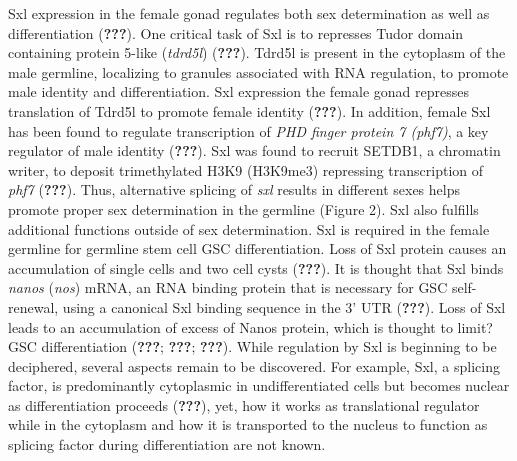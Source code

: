 \documentclass[12pt,oneside]{reedthesis}
\begin{document}
Sxl expression in the female gonad regulates both sex determination as
well as differentiation ({\textbf{???}}). One critical task of Sxl is to
represses Tudor domain containing protein 5-like (\emph{tdrd5l})
({\textbf{???}}). Tdrd5l is present in the cytoplasm of the male
germline, localizing to granules associated with RNA regulation, to
promote male identity and differentiation. Sxl expression the female
gonad represses translation of Tdrd5l to promote female identity
({\textbf{???}}). In addition, female Sxl has been found to regulate
transcription of \emph{PHD finger protein 7 (phf7)}, a key regulator of male
identity ({\textbf{???}}). Sxl was found to recruit SETDB1, a chromatin
writer, to deposit trimethylated H3K9 (H3K9me3) repressing transcription
of \emph{phf7} ({\textbf{???}}). Thus, alternative splicing of \emph{sxl} results
in different sexes helps promote proper sex determination in the
germline (Figure 2). Sxl also fulfills additional functions outside of
sex determination. Sxl is required in the female germline for germline
stem cell GSC differentiation. Loss of Sxl protein causes an
accumulation of single cells and two cell cysts ({\textbf{???}}). It is
thought that Sxl binds \emph{nanos} (\emph{nos}) mRNA, an RNA binding protein that
is necessary for GSC self-renewal, using a canonical Sxl binding
sequence in the 3' UTR ({\textbf{???}}). Loss of Sxl leads to an
accumulation of excess of Nanos protein, which is thought to limit? GSC
differentiation ({\textbf{???}}; {\textbf{???}}; {\textbf{???}}). While
regulation by Sxl is beginning to be deciphered, several aspects remain
to be discovered. For example, Sxl, a splicing factor, is predominantly
cytoplasmic in undifferentiated cells but becomes nuclear as
differentiation proceeds ({\textbf{???}}), yet, how it works as
translational regulator while in the cytoplasm and how it is transported
to the nucleus to function as splicing factor during differentiation are
not known.
\end{document}
